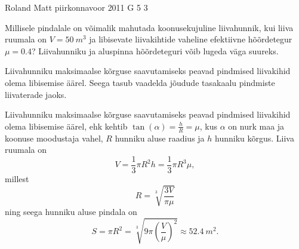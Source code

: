 {Roland Matt} %
{piirkonnavoor} %
{2011} %
{G 5} %
{3} %
{
\ifStatement
Millisele pindalale on võimalik mahutada koonusekujuline liivahunnik, kui liiva ruumala on $V=\SI{50}{m^{3}}$ ja libisevate liivakihtide vaheline efektiivne hõõrdetegur $\mu=\num{0.4}$? Liivahunniku ja aluspinna hõõrdeteguri võib lugeda väga suureks.
\fi


\ifHint
Liivahunniku maksimaalse kõrguse saavutamiseks peavad pindmised liivakihid
olema libisemise äärel. Seega tasub vaadelda jõudude tasakaalu pindmiste liivaterade jaoks.
\fi


\ifSolution
Liivahunniku maksimaalse kõrguse saavutamiseks peavad pindmised liivakihid olema libisemise äärel, ehk kehtib $\tan (\alpha)=\frac{h}{R}=\mu$, kus $\alpha$ on nurk maa ja koonuse moodustaja vahel, $R$ hunniku aluse raadius ja $h$ hunniku kõrgus. Liiva ruumala on
\[
V=\frac{1}{3} \pi R^{2} h=\frac{1}{3} \pi R^{3} \mu,
\]
millest 
\[
R=\sqrt[3]{\frac{3 V}{\pi \mu}}
\]
ning seega hunniku aluse pindala on
\[
S=\pi R^{2}=\sqrt[3]{9 \pi\left(\frac{V}{\mu}\right)^{2}} \approx \SI{52.4}{m^2}.
\]
\fi
}